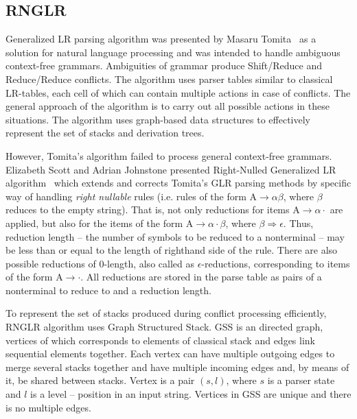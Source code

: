 \subsection{RNGLR}
Generalized LR parsing algorithm was presented by Masaru Tomita~\cite{Tomita}
as a solution for natural language processing and was intended to handle ambiguous
context-free grammars. Ambiguities of grammar produce Shift/Reduce and 
Reduce/Reduce conflicts. The algorithm uses parser tables similar to classical LR-tables,
each cell of which can contain multiple actions in case of conflicts. The general approach of 
the algorithm is to carry out all possible actions in these situations. The algorithm uses
graph-based data structures to effectively represent the set of stacks and derivation
trees.

However, Tomita's algorithm failed to process general context-free grammars.  
Elizabeth Scott and Adrian Johnstone presented Right-Nulled Generalized LR algorithm~\cite{RNGLR}
which extends and corrects Tomita's GLR parsing methods by
specific way of handling \emph{right nullable} rules (i.e. rules of the form 
$\mathrm{A} \rightarrow \alpha \beta$, where $\beta$ reduces to the empty string). 
That is, not only reductions for items $\mathrm{A} \rightarrow \alpha \cdot$ are 
applied, but also for the items of the form  $\mathrm{A} \rightarrow \alpha \cdot \beta$, 
where $\beta \Rightarrow \epsilon$. Thus, reduction length -- the number of 
symbols to be reduced to a nonterminal -- may be less than or equal to the length 
of righthand side of the rule. There are also possible reductions of 0-length, 
also called as $\epsilon$-reductions, corresponding to items of the form $\mathrm{A} 
\rightarrow \cdot$. All reductions are stored in the parse table as pairs of 
a nonterminal to reduce to and a reduction length.

To represent the set of stacks produced during conflict processing efficiently,
RNGLR algorithm uses Graph Structured Stack. GSS is an directed graph, 
vertices of which corresponds to elements of classical stack and edges link sequential 
elements together. Each vertex can have multiple outgoing edges to merge several stacks
together and have multiple incoming edges and, by means of it, be shared between stacks. 
Vertex is a pair $(s, l)$, where $s$ is a parser state and $l$ is a level -- position 
in an input string. Vertices in GSS are unique and there is no multiple edges. 

